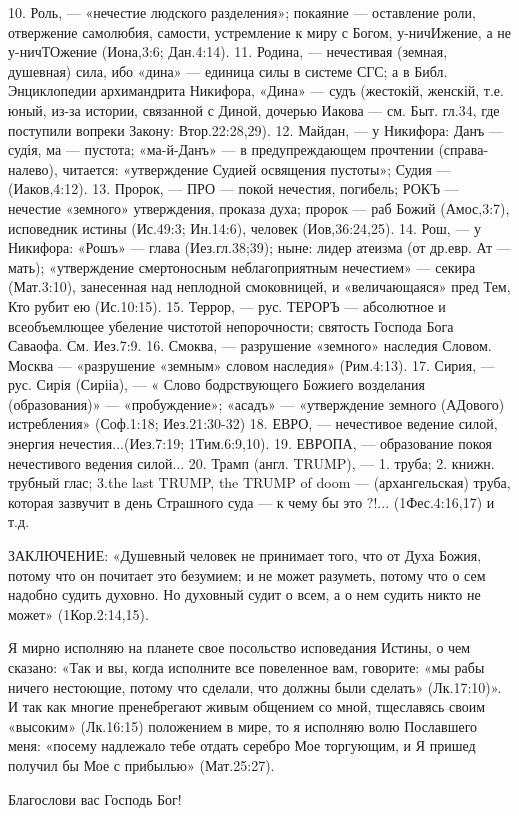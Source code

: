 10. Роль, --- «нечестие людского разделения»; покаяние --- оставление роли, отвержение самолюбия, самости, устремление к миру с Богом,  у-ничИжение, а не  у-ничТОжение (Иона,3:6;  Дан.4:14).
11. Родина, --- нечестивая (земная, душевная) сила, ибо «дина» --- единица силы в системе СГС; а в Библ. Энциклопедии архимандрита Никифора,  «Дина» --- судъ (жестокій, женскій, т.е. юный, из-за истории, связанной с Диной, дочерью Иакова --- см. Быт. гл.34, где поступили вопреки Закону: Втор.22:28,29).
12. Майдан, --- у Никифора: Данъ --- судія, ма --- пустота;  «ма-й-Данъ» --- в предупреждающем прочтении (справа-налево), читается: «утверждение Судией освящения пустоты»; Судия --- (Иаков,4:12).
13. Пророк, --- ПРО --- покой нечестия, погибель;  РОКЪ --- нечестие «земного» утверждения, проказа духа;
      пророк --- раб Божий (Амос,3:7), исповедник истины (Ис.49:3; Ин.14:6), человек (Иов,36:24,25).
14. Рош, --- у Никифора: «Рошъ» --- глава (Иез.гл.38;39); ныне: лидер атеизма (от др.евр. Ат --- мать);
      «утверждение смертоносным неблагоприятным нечестием» --- секира (Мат.3:10), занесенная над неплодной смоковницей, и «величающаяся» пред Тем, Кто рубит ею (Ис.10:15).
15. Террор, --- рус. ТЕРОРЪ --- абсолютное и всеобъемлющее убеление чистотой непорочности;  святость Господа Бога Саваофа. См. Иез.7:9.
16. Смоква, --- разрушение «земного» наследия Словом.   Москва --- «разрушение «земным» словом наследия» (Рим.4:13).
17. Сирия, --- рус. Сирія (Сирііа), --- « Слово бодрствующего Божиего возделания (образования)» --- «пробуждение»;  «асадъ» --- «утверждение земного (АДового) истребления» (Соф.1:18;  Иез.21:30-32)
18. ЕВРО, --- нечестивое ведение силой, энергия нечестия...(Иез.7:19;  1Тим.6:9,10).
19. ЕВРОПА, --- образование покоя нечестивого ведения силой...   
20. Трамп (англ. TRUMP), --- 1. труба;  2. книжн. трубный глас; 3.the last TRUMP, the TRUMP of doom ---  (архангельская) труба, которая зазвучит в день Страшного суда --- к чему бы это ?!... (1Фес.4:16,17)
          и т.д.

                ЗАКЛЮЧЕНИЕ:
«Душевный человек не принимает того, что от Духа Божия, потому что он почитает это безумием; и не может разуметь, потому что о сем надобно судить духовно.  Но духовный судит о всем, а о нем судить никто не может» (1Кор.2:14,15).

     Я мирно исполняю на планете свое посольство исповедания Истины, о чем сказано: «Так и вы, когда исполните все повеленное вам, говорите: «мы рабы ничего нестоющие, потому что сделали, что должны были сделать» (Лк.17:10)».  И так как многие пренебрегают живым общением со мной, тщеславясь своим «высоким» (Лк.16:15) положением в мире, то я исполняю волю Пославшего меня: «посему надлежало тебе отдать серебро Мое торгующим, и Я пришед получил бы Мое с прибылью» (Мат.25:27).

    
      Благослови вас Господь Бог! 
